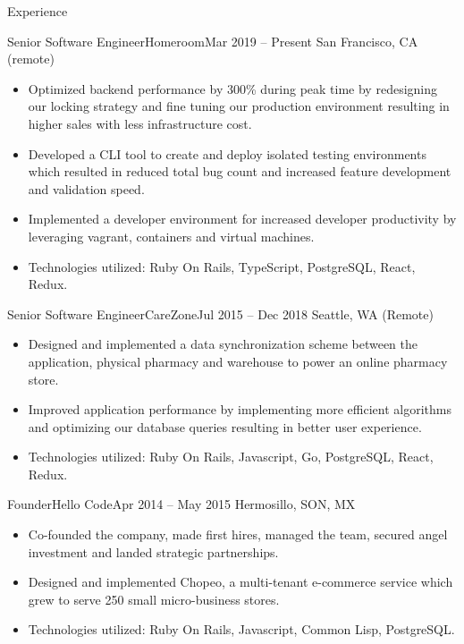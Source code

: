 \documentclass[]{mcdowellcv}
\begin{document}
\makeheader


\begin{cvsection}{Experience}
	\begin{cvsubsection}{Senior Software Engineer}{Homeroom}{Mar 2019 -- Present}
		San Francisco, CA (remote)
		\begin{itemize}%
			\item Optimized backend performance by 300\% during peak time by redesigning our locking strategy and fine tuning our production environment resulting in higher sales with less infrastructure cost.
			\item Developed a CLI tool to create and deploy isolated testing environments which resulted in reduced total bug count and increased feature development and validation speed.
			\item Implemented a developer environment for increased developer productivity by leveraging vagrant, containers and virtual machines.
			\item Technologies utilized: Ruby On Rails, TypeScript, PostgreSQL, React, Redux.
		\end{itemize}
	\end{cvsubsection}
	\begin{cvsubsection}{Senior Software Engineer}{CareZone}{Jul 2015 -- Dec 2018}
		Seattle, WA (Remote)
		\begin{itemize}%
			\item Designed and implemented a data synchronization scheme between the application, physical pharmacy and warehouse to power an online pharmacy store.
			\item Improved application performance by implementing more efficient algorithms and optimizing our database queries resulting in better user experience.
			\item Technologies utilized: Ruby On Rails, Javascript, Go, PostgreSQL, React, Redux.
		\end{itemize}
	\end{cvsubsection}
	\begin{cvsubsection}{Founder}{Hello Code}{Apr 2014 -- May 2015}
		Hermosillo, SON, MX
		\begin{itemize}%
			\item Co-founded the company, made first hires, managed the team, secured angel investment and landed strategic partnerships.
			\item Designed and implemented Chopeo, a multi-tenant e-commerce service which grew to serve 250 small micro-business stores.
			\item Technologies utilized: Ruby On Rails, Javascript, Common Lisp, PostgreSQL.

\end{itemize}
\end{cvsubsection}
\end{cvsection}
\end{document}
